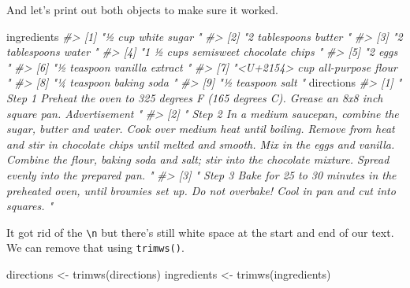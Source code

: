 \documentclass[
  12pt,
  openany]{book}
\newenvironment{Shaded}{\begin{snugshade}}{\end{snugshade}}
\newcommand{\CommentTok}[1]{\textcolor[rgb]{0.37,0.37,0.37}{\textit{#1}}}
\newcommand{\FunctionTok}[1]{\textcolor[rgb]{0,0,0}{#1}}
\newcommand{\NormalTok}[1]{#1}
\newcommand{\OtherTok}[1]{\textcolor[rgb]{0.37,0.37,0.37}{#1}}
\begin{document}
And let's print out both objects to make sure it worked.

\begin{Shaded}
\begin{Highlighting}[]
\NormalTok{ingredients}
\CommentTok{\#\textgreater{} [1] "½ cup white sugar "                 }
\CommentTok{\#\textgreater{} [2] "2 tablespoons butter "              }
\CommentTok{\#\textgreater{} [3] "2 tablespoons water "               }
\CommentTok{\#\textgreater{} [4] "1 ½ cups semisweet chocolate chips "}
\CommentTok{\#\textgreater{} [5] "2 eggs "                            }
\CommentTok{\#\textgreater{} [6] "½ teaspoon vanilla extract "        }
\CommentTok{\#\textgreater{} [7] "\textless{}U+2154\textgreater{} cup all{-}purpose flour "    }
\CommentTok{\#\textgreater{} [8] "¼ teaspoon baking soda "            }
\CommentTok{\#\textgreater{} [9] "½ teaspoon salt "}
\NormalTok{directions}
\CommentTok{\#\textgreater{} [1] "   Step 1   Preheat the oven to 325 degrees F (165 degrees C). Grease an 8x8 inch square pan.    Advertisement "                                                                                                                                                                                                                 }
\CommentTok{\#\textgreater{} [2] "   Step 2   In a medium saucepan, combine the sugar, butter and water. Cook over medium heat until boiling. Remove from heat and stir in chocolate chips until melted and smooth. Mix in the eggs and vanilla. Combine the flour, baking soda and salt; stir into the chocolate mixture. Spread evenly into the prepared pan.   "}
\CommentTok{\#\textgreater{} [3] "   Step 3   Bake for 25 to 30 minutes in the preheated oven, until brownies set up. Do not overbake! Cool in pan and cut into squares.   "}
\end{Highlighting}
\end{Shaded}

It got rid of the \texttt{\textbackslash{}n} but there's still white space at the start and end of our text. We can remove that using \texttt{trimws()}.

\begin{Shaded}
\begin{Highlighting}[]
\NormalTok{directions }\OtherTok{\textless{}{-}} \FunctionTok{trimws}\NormalTok{(directions)}
\NormalTok{ingredients }\OtherTok{\textless{}{-}} \FunctionTok{trimws}\NormalTok{(ingredients)}
\end{Highlighting}
\end{Shaded}
\end{document}
